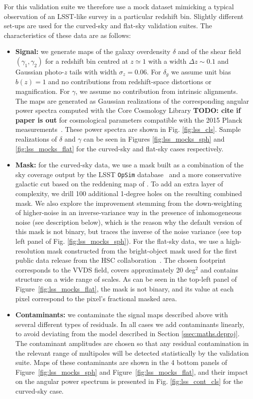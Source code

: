 \documentclass[usenatbib]{mnrasb}
\newcommand{\todo}[1]{{\bf TODO: #1}}
\newcommand{\todo}[1]{}
\begin{document}
        For this validation suite we therefore use a mock dataset mimicking a typical observation of an LSST-like survey in a particular redshift bin. Slightly different set-ups are used for the curved-sky and flat-sky validation suites. The characteristics of these data are as follows:
        \begin{itemize}
          \item {\bf Signal:} we generate maps of the galaxy overdensity $\delta$ and of the shear field $(\gamma_1,\gamma_2)$ for a redshift bin centred at $z\simeq1$ with a width $\Delta z\sim0.1$ and Gaussian photo-$z$ tails with width $\sigma_z=0.06$. For $\delta_g$ we assume unit bias $b(z)=1$ and no contributions from redshift-space distortions or magnification. For $\gamma$, we assume no contribution from intrinsic alignments. The maps are generated as Gaussian realizations of the corresponding angular power spectra computed with the Core Cosmology Library \todo{cite if paper is out} for cosmological parameters compatible with the 2015 Planck measurements~\citet{2016A&A...594A..13P}. These power spectra are shown in Fig. \ref{fig:lss_cls}. Sample realizations of $\delta$ and $\gamma$ can be seen in Figures \ref{fig:lss_mocks_sph} and \ref{fig:lss_mocks_flat} for the curved-sky and flat-sky cases respectively.
          \item {\bf Mask:} for the curved-sky data, we use a mask built as a combination of the sky coverage output by the LSST {\tt OpSim} database~\citet{2014SPIE.9150E..15D} and a more conservative galactic cut based on the reddening map of \citet{1998wfsc.conf..297S}. To add an extra layer of complexity, we drill 100 additional 1-degree holes on the resulting combined mask. We also explore the improvement stemming from the down-weighting of higher-noise in an inverse-variance way in the presence of inhomogeneous noise (see description below), which is the reason why the default version of this mask is not binary, but traces the inverse of the noise variance (see top left panel of Fig. \ref{fig:lss_mocks_sph}). For the flat-sky data, we use a high-resolution mask constructed from the bright-object mask used for the first public data release from the HSC collaboration~\citep{2018PASJ...70S...4A}. The chosen footprint corresponds to the VVDS field, covers approximately 20 deg$^2$ and contains structure on a wide range of scales. As can be seen in the top-left panel of Figure~\ref{fig:lss_mocks_flat}, the mask is not binary, and its value at each pixel correspond to the pixel's fractional masked area.
          \item {\bf Contaminants:} we contaminate the signal maps described above with several different types of residuals. In all cases we add contaminants linearly, to avoid deviating from the model described in Section \ref{ssec:maths.deproj}. The contaminant amplitudes are chosen so that any residual contamination in the relevant range of multipoles will be detected statistically by the validation suite. Maps of these contaminants are shown in the 4 bottom panels of Figure~\ref{fig:lss_mocks_sph} and Figure~\ref{fig:lss_mocks_flat}, and their impact on the angular power spectrum is presented in Fig. \ref{fig:lss_cont_cls} for the curved-sky case.

\end{itemize}
\end{document}
